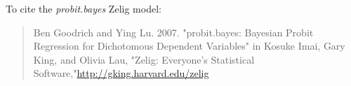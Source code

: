 To cite the \emph{ probit.bayes } Zelig model:
 \begin{verse}
 Ben Goodrich and Ying Lu. 2007. "probit.bayes: Bayesian Probit Regression for Dichotomous Dependent Variables" in Kosuke Imai, Gary King, and Olivia Lau, "Zelig: Everyone's Statistical Software,"\url{http://gking.harvard.edu/zelig} 
\end{verse}